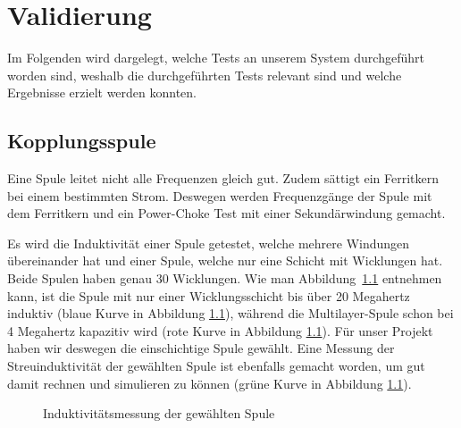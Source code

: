 \chapter{Validierung}
\label{chap:validierung}
{\enlargethispage{4em}

Im Folgenden  wird dargelegt,  welche Tests  an unserem  System durchgef\"uhrt
worden  sind, weshalb  die  durchgef\"uhrten Tests  relevant  sind und  welche
Ergebnisse erzielt werden konnten.

\section{Kopplungsspule}
\label{sec:val:coupling:coil}

Eine  Spule  leitet nicht  alle  Frequenzen  gleich gut. Zudem  s\"attigt  ein
Ferritkern  bei einem  bestimmten Strom. Deswegen  werden Frequenzg\"ange  der
Spule mit dem Ferritkern und  ein Power-Choke Test mit einer Sekund\"arwindung
gemacht.

Es   wird   die   Induktivit\"at   einer  Spule   getestet,   welche   mehrere
Windungen  \"ubereinander  hat  und  einer  Spule,  welche  nur  eine  Schicht
mit  Wicklungen   hat. Beide  Spulen   haben  genau  30   Wicklungen. Wie  man
Abbildung~\ref{fig:meas:coupling:coil:L}  entnehmen kann,  ist  die Spule  mit
nur  einer Wicklungsschicht  bis  \"uber 20  Megahertz  induktiv (blaue  Kurve
in Abbildung  \ref{fig:meas:coupling:coil:L}), w\"ahrend  die Multilayer-Spule
schon   bei   4   Megahertz   kapazitiv  wird   (rote   Kurve   in   Abbildung
\ref{fig:meas:coupling:coil:L}). F\"ur  unser   Projekt  haben   wir  deswegen
die  einschichtige  Spule   gew\"ahlt. Eine  Messung  der  Streuinduktivit\"at
der   gew\"ahlten  Spule   ist  ebenfalls   gemacht  worden,   um  gut   damit
rechnen   und   simulieren   zu   k\"onnen   (gr\"une   Kurve   in   Abbildung
\ref{fig:meas:coupling:coil:L}).

\begin{figure}[h!tb]
    \centering
    
    \caption[Messresultate Kopplungsspule: Induktivit\"at]{Induktivit\"atsmessung der gew\"ahlten Spule}
    \label{fig:meas:coupling:coil:L}
\end{figure}

\clearpage}
